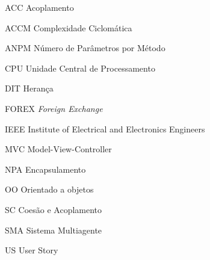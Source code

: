 \begin{siglas}

\item [ACC] Acoplamento
\item [ACCM] Complexidade Ciclomática
\item [ANPM] Número de Parâmetros por Método
\item [CPU] Unidade Central de Processamento
\item [DIT] Herança
\item [FOREX] \textit{Foreign Exchange}
\item [IEEE] Institute of Electrical and Electronics Engineers
\item [MVC] Model-View-Controller
\item [NPA] Encapsulamento
\item [OO] Orientado a objetos
\item [SC] Coesão e Acoplamento
\item [SMA] Sistema Multiagente
\item [US] User Story
\end{siglas}
